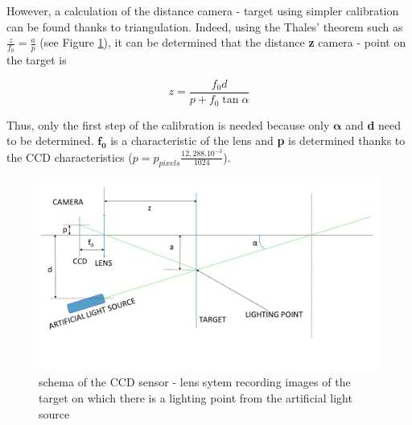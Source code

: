 However, a calculation of the distance camera - target using simpler calibration can be found thanks to triangulation. Indeed, using the Thales' theorem such as $\frac{z}{f_0} = \frac{a}{p}$ (see Figure \ref{fig:schema1D_2}), it can be determined that the distance \textbf{z} camera - point on the target is


\begin{equation}
z = \frac{f_0d}{p+f_0 \tan \alpha}
\label{eq:formule1D_2}
\end{equation}

Thus, only the first step of the calibration is needed because only $\bm{\alpha}$ and \textbf{d} need to be determined. $\bm{f_0}$ is a characteristic of the lens and \textbf{p} is determined thanks to the CCD characteristics ($p = p_{pixels} \frac{12,288.10^{-3}}{1024}$).

\begin{figure}[H]
  \centerline{\includegraphics[scale=0.5]{fig/schema1D_2.jpg}}
  \caption{schema of the CCD sensor - lens sytem recording images of the target on which there is a lighting point from the artificial light source}
  \label{fig:schema1D_2}
\end{figure}